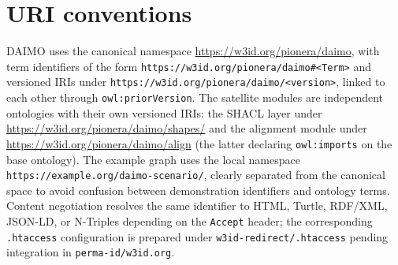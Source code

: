 \documentclass[Afour,sagev,times]{sagej}
\newcommand{\code}[1]{\texttt{#1}}
\begin{document}
\section{URI conventions}\label{app:uris}

DAIMO uses the canonical namespace \url{https://w3id.org/pionera/daimo}, with term identifiers of the form \code{https://w3id.org/pionera/daimo\#<Term>} and versioned IRIs under \code{https://w3id.org/pionera/daimo/<version>}, linked to each other through \code{owl:priorVersion}. The satellite modules are independent ontologies with their own versioned IRIs: the SHACL layer under \url{https://w3id.org/pionera/daimo/shapes/} and the alignment module under \url{https://w3id.org/pionera/daimo/align} (the latter declaring \code{owl:imports} on the base ontology). The example graph uses the local namespace \code{https://example.org/daimo-scenario/}, clearly separated from the canonical space to avoid confusion between demonstration identifiers and ontology terms. Content negotiation resolves the same identifier to HTML, Turtle, RDF/XML, JSON-LD, or N-Triples depending on the \code{Accept} header; the corresponding \code{.htaccess} configuration is prepared under \code{w3id-redirect/.htaccess} pending integration in \code{perma-id/w3id.org}.
\end{document}
